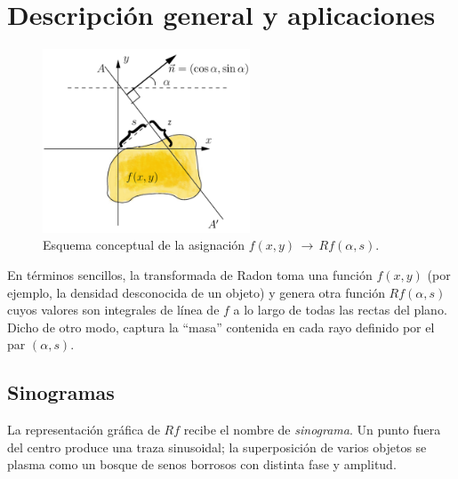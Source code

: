 \documentclass[11pt]{article}
\begin{document}
\section{Descripción general y aplicaciones}\label{sec:general}

\begin{figure}[H]
\centering
\includegraphics[width=0.55\textwidth]{figures/Radon_transform.png}
\caption{Esquema conceptual de la asignación $f(x,y)\,\rightarrow\,Rf(\alpha,s)$.}
\label{fig:mapping}
\end{figure}
\FloatBarrier

En términos sencillos, la transformada de Radon toma una función
$f(x,y)$ (por ejemplo, la densidad desconocida de un objeto) y genera
otra función $Rf(\alpha,s)$ cuyos valores son integrales de línea de $f$
a lo largo de todas las rectas del plano.  Dicho de otro modo, captura
la “masa” contenida en cada rayo definido por el par $(\alpha,s)$.

\subsection*{Sinogramas}

La representación gráfica de $Rf$ recibe el nombre de
\emph{sinograma}.  Un punto fuera del centro produce una traza
sinusoidal; la superposición de varios objetos se plasma como un bosque
de senos borrosos con distinta fase y amplitud.
\end{document}
